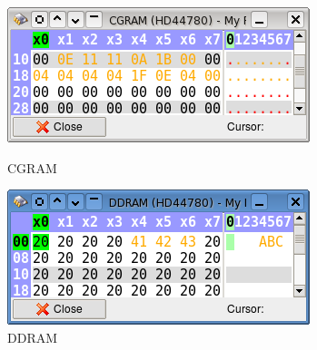\documentclass[a4paper,twoside,12pt]{book}
\begin{document}
\begin{figure}[h!]
\begin{minipage}[b]{.5\textwidth}
					\begin{minipage}[b]{\textwidth}
						\begin{minipage}[b]{.45\textwidth}
							\centering{}
							\includegraphics[width=.9\textwidth]{img/045.png}
							\caption{CGRAM}
						\end{minipage}
						\begin{minipage}[b]{.45\textwidth}
							\centering{}
							\includegraphics[width=.9\textwidth]{img/046.png}
							\caption{DDRAM}
						\end{minipage}
					\end{minipage}
				\end{minipage}
				\begin{minipage}[b]{.5\textwidth}
					\centering{}

\end{minipage}
\end{figure}
\end{document}
